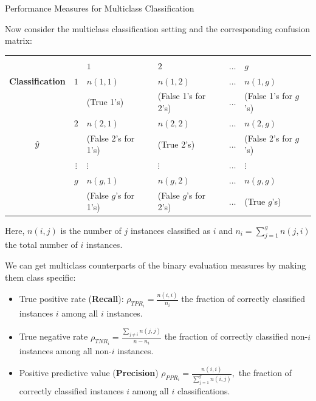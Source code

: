 \documentclass[11pt,compress,t,notes=noshow, xcolor=table]{beamer}
\begin{document}
\begin{vbframe}{Performance Measures for Multiclass Classification}
	\scriptsize{
		Now consider the multiclass classification setting and the corresponding confusion matrix:
		\begin{center}
			\tiny
			\begin{tabular}{cc|>{\centering\arraybackslash}p{8em}>{\centering\arraybackslash}p{8em}>{\centering\arraybackslash}p{5em}>{\centering\arraybackslash}p{8em}}
				& & \multicolumn{4}{c}{\bfseries True Class $y$} \\
				& & $1$ & $2$ & $\ldots$ & $g$  \\
				\hline
				\bfseries Classification     & $1$ & $n(1,1)$  &  $n(1,2)$  & $\ldots$ &  $n(1,g)$ \\
				& & (True 1's) & (False 1's for 2's) & $\ldots$ &  (False 1's for $g$'s)  \\
				& $2$ &  $n(2,1)$  &  $n(2,2)$  & $\ldots$ & $n(2,g)$  \\
				$\hat{y}$ & & (False 2's for 1's) & (True 2's) & $\ldots$ &  (False 2's for $g$'s)  \\
				& $\vdots$ & $\vdots$ & $\vdots$ & $\ldots$ & $\vdots$ \\
				& $g$ & $n(g,1)$ & $n(g,2)$  & $\ldots$ &  $n(g,g)$\\
				& & (False $g$'s for 1's) & (False $g$'s for 2's) & $\ldots$ &  (True $g$'s)  \\
			\end{tabular}
		\end{center}
		Here, $n(i,j)$ is the number of $j$ instances classified as $i$ and $n_i = \sum_{j=1}^g n(j,i)$ the total number of $i$ instances.
%		
		
		We can get multiclass counterparts of the binary evaluation measures by making them class specific: 
		
		\begin{itemize}
			
			\item True positive rate (\textbf{Recall}): $\rho_{TPR_i} = \frac{n(i,i)}{n_i}$ \quad the fraction of correctly classified instances $i$ among all $i$ instances.
			\item True negative rate $\rho_{TNR_i} = \frac{\sum_{j\neq i}n(j,j)}{n-n_i}$ \quad the fraction of correctly classified non-$i$ instances among all non-$i$ instances.
%			
			\item Positive predictive value (\textbf{Precision}) $\rho_{PPR_i} = \frac{n(i,i)}{\sum_{j=1}^g n(i,j)},$  the fraction of correctly classified instances $i$ among all $i$ classifications.
		\end{itemize}
	}
\end{vbframe}
\end{document}
